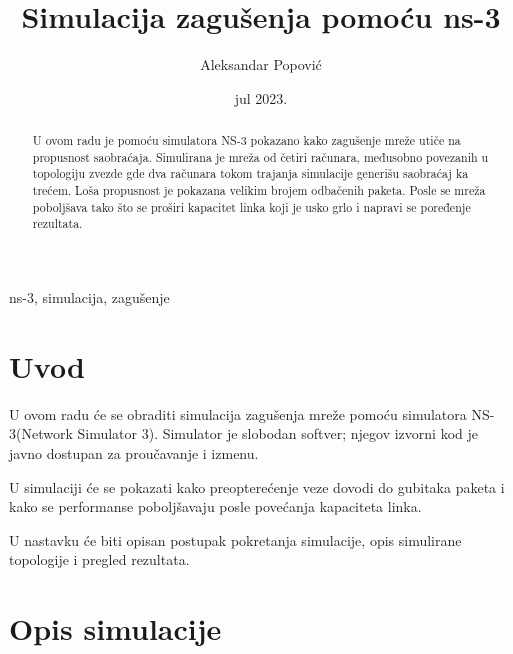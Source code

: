 \documentclass[a4paper, 12pt, projekat]{etf}
\title{Simulacija zagušenja pomoću ns-3}
\author{Aleksandar Popović}
\date{jul 2023.}
\begin{document}
	\maketitle
	\begin{abstract}
		U ovom radu je pomoću simulatora NS-3 pokazano kako zagušenje mreže utiče na propusnost saobraćaja. Simulirana je mreža od četiri računara, međusobno povezanih u topologiju zvezde gde dva računara tokom trajanja simulacije generišu saobraćaj ka trećem. Loša propusnost je pokazana velikim brojem odbačenih paketa. Posle se mreža poboljšava tako što se proširi kapacitet linka koji je usko grlo i napravi se poređenje rezultata.
	\end{abstract}
	\begin{keywords}
		ns-3, simulacija, zagu\v{s}enje
	\end{keywords}
	\tableofcontents
	\listoffigures
	\listoftables
	
	\chapter{Uvod}
	U ovom radu će se obraditi simulacija zagušenja mreže pomoću simulatora NS-3(Network Simulator 3). 
	Simulator je slobodan softver; njegov izvorni kod je javno dostupan za proučavanje i izmenu.
	
	
	U simulaciji će se pokazati kako preopterećenje veze dovodi do gubitaka paketa i kako se performanse poboljšavaju posle povećanja kapaciteta linka.
	
	
	U nastavku će biti opisan postupak pokretanja simulacije, opis simulirane topologije i pregled rezultata.
	
	\chapter{Opis simulacije}
	
\end{document}
